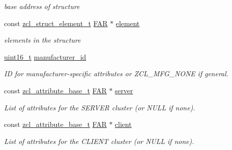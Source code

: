 \begin{DoxyCompactItemize}
\begin{DoxyCompactList}\small\item\em base address of structure \end{DoxyCompactList}\item 
\mbox{\label{group__zcl_gacfb513b58d4138fe737df9448fb52e5a}} 
const \hyperlink{structzcl__struct__element__t}{zcl\+\_\+struct\+\_\+element\+\_\+t} \hyperlink{group__hal_gaef060b3456fdcc093a7210a762d5f2ed}{F\+AR} $\ast$ \hyperlink{group__zcl_gacfb513b58d4138fe737df9448fb52e5a}{element}
\begin{DoxyCompactList}\small\item\em elements in the structure \end{DoxyCompactList}\item 
\mbox{\label{group__zcl_ga4ad31fcb69f8aaca8f3c1820bb4d8594}} 
\hyperlink{group__hal__dos_ga5a8b2dc9e45a9ee81a94ef304fb62505}{uint16\+\_\+t} \hyperlink{group__zcl_ga4ad31fcb69f8aaca8f3c1820bb4d8594}{manufacturer\+\_\+id}
\begin{DoxyCompactList}\small\item\em ID for manufacturer-\/specific attributes or Z\+C\+L\+\_\+\+M\+F\+G\+\_\+\+N\+O\+NE if general. \end{DoxyCompactList}\item 
\mbox{\label{group__zcl_ga711c76cba8f7c0f30a95dcc5f7c0b7fb}} 
const \hyperlink{structzcl__attribute__base__t}{zcl\+\_\+attribute\+\_\+base\+\_\+t} \hyperlink{group__hal_gaef060b3456fdcc093a7210a762d5f2ed}{F\+AR} $\ast$ \hyperlink{group__zcl_ga711c76cba8f7c0f30a95dcc5f7c0b7fb}{server}
\begin{DoxyCompactList}\small\item\em List of attributes for the S\+E\+R\+V\+ER cluster (or N\+U\+LL if none). \end{DoxyCompactList}\item 
\mbox{\label{group__zcl_gabb37e65dc5e6f9179ff1c17268031d9b}} 
const \hyperlink{structzcl__attribute__base__t}{zcl\+\_\+attribute\+\_\+base\+\_\+t} \hyperlink{group__hal_gaef060b3456fdcc093a7210a762d5f2ed}{F\+AR} $\ast$ \hyperlink{group__zcl_gabb37e65dc5e6f9179ff1c17268031d9b}{client}
\begin{DoxyCompactList}\small\item\em List of attributes for the C\+L\+I\+E\+NT cluster (or N\+U\+LL if none). \end{DoxyCompactList}\item 

\end{DoxyCompactItemize}
